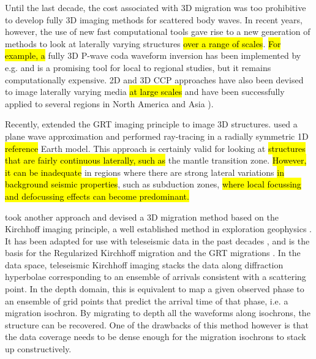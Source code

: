 \documentclass[10pt,a4paper]{article}
\begin{document}
Until the last decade, the cost associated with 3D migration was too prohibitive to develop fully 3D imaging methods for scattered body waves. 
In recent years, however, the use of new fast computational tools gave rise to a new generation of methods to look at laterally varying structures \hl{over a range of scales}. 
\hl{For example, a} fully 3D P-wave coda waveform inversion has been implemented by e.g. \citet{fred_gji_04} and is a promising tool for local to regional studies, but it remains computationally expensive. 
2D and 3D CCP approaches have also been devised to image laterally varying media \hl{at large scales} and have been successfully applied to several regions in North America and Asia \citep{tauz_epsl_16,rond_srl_17}). 

Recently, \citet{pavl_cg_11} extended the GRT imaging principle to image 3D structures. 
\citet{wang_jgr_16} used a plane wave approximation and performed ray-tracing in a radially symmetric 1D \hl{reference} Earth model. 
This approach is certainly valid for looking at \hl{structures that are fairly continuous laterally, such as} the mantle transition zone.
\hl{However, it can be inadequate} in regions where there are strong lateral variations \hl{in background seismic properties}, such as subduction zones, \hl{where local focussing and defocussing effects can become predominant.} 

\citet{cheng_gji_16} took another approach and devised a 3D migration method based on the Kirchhoff imaging principle, a well established method in exploration geophysics \citep{clae_book_85}. 
It has been adapted for use with teleseismic data in the past decades \citep{rybe_gji_00}, and is the basis for the Regularized Kirchhoff migration \citep{wils_jgr_05} and the GRT migrations \citep{bost_jgr_01,liu_gji_13}. 
In the data space, teleseismic Kirchhoff imaging stacks the data along diffraction hyperbolae corresponding to an ensemble of arrivals consistent with a scattering point. 
In the depth domain, this is equivalent to map a given observed phase to an ensemble of grid points that predict the arrival time of that phase, i.e. a migration isochron. 
By migrating to depth all the waveforms along isochrons, the structure can be recovered. 
One of the drawbacks of this method however is that the data coverage needs to be dense enough for the migration isochrons to stack up constructively.
\end{document}
